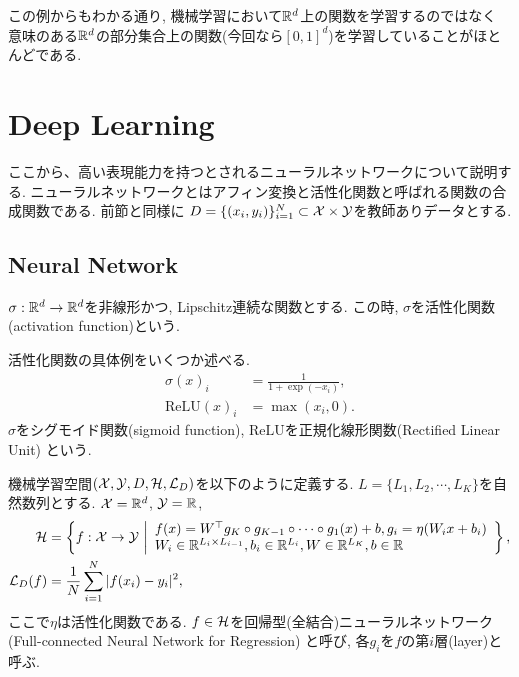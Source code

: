 この例からもわかる通り, 機械学習において$\mathbb{R}^d$上の関数を学習するのではなく
意味のある$\mathbb{R}^d$の部分集合上の関数(今回なら$[0, 1]^d$)を学習していることがほとんどである.
\section{Deep Learning}
ここから、高い表現能力を持つとされるニューラルネットワークについて説明する. 
ニューラルネットワークとはアフィン変換と活性化関数と呼ばれる関数の合成関数である. 前節と同様に
$D = \{(x_i, y_i)\}_{i = 1}^{N}\subset\mathcal{X}\times\mathcal{Y}$を教師ありデータとする.
\subsection{Neural Network}
\begin{Defi}[活性化関数]
    $\sigma:\mathbb{R}^{d}\to\mathbb{R}^{d}$を非線形かつ, Lipschitz連続な関数とする. 
    この時, $\sigma$を活性化関数(activation function)という.
\end{Defi}
\begin{Ex}[活性化関数の具体例]
    活性化関数の具体例をいくつか述べる. 
    \begin{align*}
        \sigma(x)_{i} &= \frac{1}{1 + \exp(-x_{i})},\\
        \text{ReLU}(x)_{i} &= \max(x_{i}, 0).
    \end{align*}
    $\sigma$をシグモイド関数(sigmoid function), $\text{ReLU}$を正規化線形関数(Rectified Linear Unit)
    という.
\end{Ex}
\begin{Defi}[回帰型ニューラルネットワーク]
    機械学習空間$(\mathcal{X}, \mathcal{Y}, D, \mathcal{H}, \mathcal{L}_{D})$を以下のように定義する. $L = \{L_{1}, L_{2}, \cdots, L_{K}\}$を自然数列とする.
    $\mathcal{X} = \mathbb{R}^d$, $\mathcal{Y} = \mathbb{R}$, 
    \begin{align*}
        \mathcal{H} &= \left\{f:\mathcal{X}\to\mathcal{Y}~\middle|
        \begin{array}{l}
            f(x) = W^{\top}g_{K}\circ g_{K - 1}\circ\cdots\circ g_{1}(x) + b, g_{i} = \eta(W_{i}x + b_{i})\\
            W_{i}\in\mathbb{R}^{L_{i}\times L_{i - 1}}, b_{i}\in\mathbb{R}^{L_{i}}, W\in\mathbb{R}^{L_{K}}, b\in\mathbb{R}
        \end{array}
        \right\},\\
        \mathcal{L}_{D}(f) &= \frac{1}{N}\sum_{i = 1}^{N}|f(x_i) - y_i|^2,
    \end{align*}
    ここで$\eta$は活性化関数である. $f\in\mathcal{H}$を回帰型(全結合)ニューラルネットワーク(Full-connected Neural Network for Regression)
    と呼び, 各$g_{i}$を$f$の第$i$層(layer)と呼ぶ.
\end{Defi}

